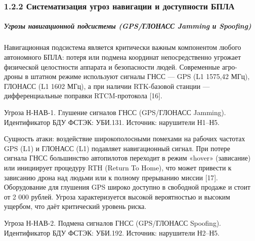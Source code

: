 \documentclass[14pt,a4paper]{extarticle}
\begin{document}
\hypertarget{ux441ux438ux441ux442ux435ux43cux430ux442ux438ux437ux430ux446ux438ux44f-ux443ux433ux440ux43eux437-ux43dux430ux432ux438ux433ux430ux446ux438ux438-ux438-ux434ux43eux441ux442ux443ux43fux43dux43eux441ux442ux438-ux431ux43fux43bux430}{%
\subsubsection{1.2.2 Систематизация угроз навигации и доступности БПЛА}\label{ux441ux438ux441ux442ux435ux43cux430ux442ux438ux437ux430ux446ux438ux44f-ux443ux433ux440ux43eux437-ux43dux430ux432ux438ux433ux430ux446ux438ux438-ux438-ux434ux43eux441ux442ux443ux43fux43dux43eux441ux442ux438-ux431ux43fux43bux430}}

\hypertarget{ux443ux433ux440ux43eux437ux44b-ux43dux430ux432ux438ux433ux430ux446ux438ux43eux43dux43dux43eux439-ux43fux43eux434ux441ux438ux441ux442ux435ux43cux44b-gpsux433ux43bux43eux43dux430ux441ux441-jamming-ux438-spoofing}{%
\subparagraph{Угрозы навигационной подсистемы (GPS/ГЛОНАСС Jamming и Spoofing)}\label{ux443ux433ux440ux43eux437ux44b-ux43dux430ux432ux438ux433ux430ux446ux438ux43eux43dux43dux43eux439-ux43fux43eux434ux441ux438ux441ux442ux435ux43cux44b-gpsux433ux43bux43eux43dux430ux441ux441-jamming-ux438-spoofing}}

Навигационная подсистема является критически важным компонентом любого автономного БПЛА: потеря или подмена координат непосредственно угрожает физической целостности аппарата и безопасности людей. Современные агро-дроны в штатном режиме используют сигналы ГНСС --- GPS (L1 1575,42 МГц), ГЛОНАСС (L1 1602 МГц), а при наличии RTK-базовой станции --- дифференциальные поправки RTCM-протокола {[}16{]}.

Угроза Н-НАВ-1. Глушение сигналов ГНСС (GPS/ГЛОНАСС Jamming). Идентификатор БДУ ФСТЭК: УБИ.131. Источник: нарушители Н1--Н5.

Сущность атаки: воздействие широкополосными помехами на рабочих частотах GPS (L1) и ГЛОНАСС (L1) подавляет навигационный сигнал. При потере сигнала ГНСС большинство автопилотов переходит в режим «hover» (зависание) или инициирует процедуру RTH (Return To Home), что может привести к зависанию дрона над людьми или к полному прерыванию миссии {[}17{]}. Оборудование для глушения GPS широко доступно в свободной продаже и стоит от 2 000 рублей. Угроза характеризуется высокой вероятностью и высоким ущербом, что даёт критический уровень риска.

Угроза Н-НАВ-2. Подмена сигналов ГНСС (GPS/ГЛОНАСС Spoofing). Идентификатор БДУ ФСТЭК: УБИ.192. Источник: нарушители Н2--Н5.
\end{document}
